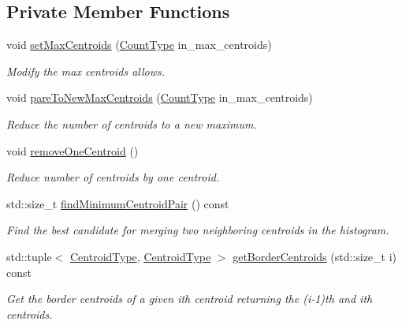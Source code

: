 \subsection*{Private Member Functions}
\begin{DoxyCompactItemize}
\item 
void \hyperlink{structvt_1_1util_1_1adt_1_1_histogram_approx_aa23f54efa5c883d2759ceacd3f32279a}{set\+Max\+Centroids} (\hyperlink{structvt_1_1util_1_1adt_1_1_histogram_approx_aa2fb74665588d311da76dd821f2912c6}{Count\+Type} in\+\_\+max\+\_\+centroids)
\begin{DoxyCompactList}\small\item\em Modify the max centroids allows. \end{DoxyCompactList}\item 
void \hyperlink{structvt_1_1util_1_1adt_1_1_histogram_approx_a8827a511e5b810ffca9da33d769bc4b9}{pare\+To\+New\+Max\+Centroids} (\hyperlink{structvt_1_1util_1_1adt_1_1_histogram_approx_aa2fb74665588d311da76dd821f2912c6}{Count\+Type} in\+\_\+max\+\_\+centroids)
\begin{DoxyCompactList}\small\item\em Reduce the number of centroids to a new maximum. \end{DoxyCompactList}\item 
void \hyperlink{structvt_1_1util_1_1adt_1_1_histogram_approx_a948e8a7dec4f205fc5bf1d1b896211b1}{remove\+One\+Centroid} ()
\begin{DoxyCompactList}\small\item\em Reduce number of centroids by one centroid. \end{DoxyCompactList}\item 
std\+::size\+\_\+t \hyperlink{structvt_1_1util_1_1adt_1_1_histogram_approx_a0bba7a9d03149be996f45bfe245abd03}{find\+Minimum\+Centroid\+Pair} () const
\begin{DoxyCompactList}\small\item\em Find the best candidate for merging two neighboring centroids in the histogram. \end{DoxyCompactList}\item 
std\+::tuple$<$ \hyperlink{structvt_1_1util_1_1adt_1_1_histogram_approx_aabacbad5be3a407cb00938f079177b95}{Centroid\+Type}, \hyperlink{structvt_1_1util_1_1adt_1_1_histogram_approx_aabacbad5be3a407cb00938f079177b95}{Centroid\+Type} $>$ \hyperlink{structvt_1_1util_1_1adt_1_1_histogram_approx_ac376fd975845204cca3425c8517376f6}{get\+Border\+Centroids} (std\+::size\+\_\+t i) const
\begin{DoxyCompactList}\small\item\em Get the border centroids of a given i\textquotesingle{}th centroid returning the (i-\/1)\textquotesingle{}th and i\textquotesingle{}th centroids. \end{DoxyCompactList}\end{DoxyCompactItemize}
